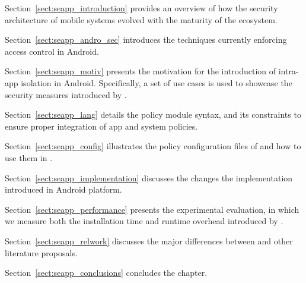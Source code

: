 \begin{compactitem}
    \item Section~\ref{sect:seapp_introduction} provides an overview
     of how the security architecture of mobile systems evolved with
     the maturity of the ecosystem.
    \item Section~\ref{sect:seapp_andro_sec} introduces the techniques
     currently enforcing access control in Android.
    \item Section~\ref{sect:seapp_motiv} presents the motivation for
     the introduction of intra-app isolation in Android. Specifically,
     a set of use cases is used to showcase the security measures
     introduced by \seapp.
    \item Section~\ref{sect:seapp_lang} details the \seapp policy
     module syntax, and its constraints to ensure proper integration
     of app and system policies.
    \item Section~\ref{sect:seapp_config} illustrates the policy 
     configuration files of \sea and how to use them in \seapp.
    \item Section~\ref{sect:seapp_implementation} discusses the
     changes the \seapp implementation introduced in Android platform.
    \item Section~\ref{sect:seapp_performance} presents the
     experimental evaluation, in which we measure both the
     installation time and runtime overhead introduced by \seapp.
    \item Section~\ref{sect:seapp_relwork} discusses the major
     differences between \seapp and other literature proposals.
    \item Section~\ref{sect:seapp_conclusions} concludes the chapter.
\end{compactitem}
\medskip

